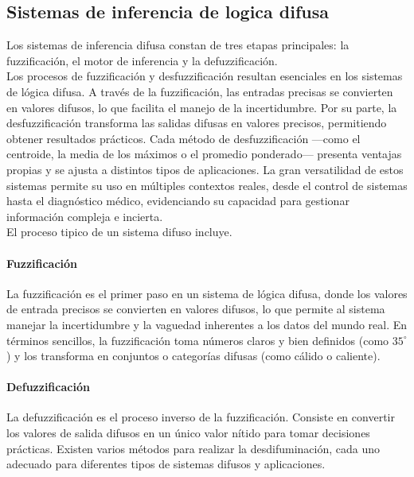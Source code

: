 \subsection{Sistemas de inferencia de logica difusa}
Los sistemas de inferencia difusa constan de tres etapas principales: la fuzzificación, el motor de inferencia y la defuzzificación.\\ 
Los procesos de fuzzificación y desfuzzificación resultan esenciales en los sistemas de lógica difusa. A través de la fuzzificación, las entradas precisas se convierten en valores difusos, lo que facilita el manejo de la incertidumbre. Por su parte, la desfuzzificación transforma las salidas difusas en valores precisos, permitiendo obtener resultados prácticos. Cada método de desfuzzificación —como el centroide, la media de los máximos o el promedio ponderado— presenta ventajas propias y se ajusta a distintos tipos de aplicaciones. La gran versatilidad de estos sistemas permite su uso en múltiples contextos reales, desde el control de sistemas hasta el diagnóstico médico, evidenciando su capacidad para gestionar información compleja e incierta.\\
El proceso tipico de un sistema difuso incluye.
\paragraph{Fuzzificación} La fuzzificación es el primer paso en un sistema de lógica difusa, donde los valores de entrada precisos se convierten en valores difusos, lo que permite al sistema manejar la incertidumbre y la vaguedad inherentes a los datos del mundo real. En términos sencillos, la fuzzificación toma números claros y bien definidos (como $35^\circ$) y los transforma en conjuntos o categorías difusas (como cálido o caliente).
\paragraph{Defuzzificación} La defuzzificación es el proceso inverso de la fuzzificación. Consiste en convertir los valores de salida difusos en un único valor nítido para tomar decisiones prácticas. Existen varios métodos para realizar la desdifuminación, cada uno adecuado para diferentes tipos de sistemas difusos y aplicaciones.

